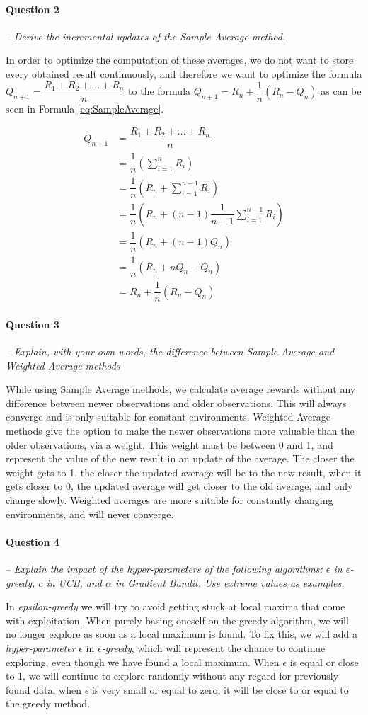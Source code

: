 \documentclass[a4paper]{article}
\newcommand{\question}[2]{
\paragraph{Question #1} -- \textit{#2}

}
\begin{document}
\question{2}{Derive the incremental updates of the Sample 
Average method.}
In order to optimize the computation of these averages, we do not want to store every obtained result continuously, and therefore we want to optimize the formula $Q_{n+1} = \dfrac{R_1 + R_2 + ... + R_n}{n}$ to the formula $Q_{n+1} = R_n + \dfrac{1}{n} (R_n - Q_n)$ as can be seen in Formula \ref{eq:SampleAverage}.

\begin{equation}\label{eq:SampleAverage}
\begin{split}
Q_{n+1} &= \dfrac{R_1 + R_2 + ... + R_n}{n} \\
		&= \dfrac{1}{n} (\sum_{i=1}^{n} R_i) \\
		&= \dfrac{1}{n} (R_n + \sum_{i=1}^{n-1} R_i) \\
		&= \dfrac{1}{n} (R_n + (n-1) \dfrac{1}{n-1} \sum_{i=1}^{n-1} R_i) \\
		&= \dfrac{1}{n} (R_n + (n-1) Q_n) \\
		&= \dfrac{1}{n} (R_n + n Q_n - Q_n) \\
		&= R_n + \dfrac{1}{n} (R_n - Q_n) 
\end{split}
\end{equation}


\question{3}{Explain, with your own words, the difference between Sample Average and Weighted Average methods}
While using Sample Average methods, we calculate average rewards without any difference between newer observations and older observations. This will always converge and is only suitable for constant environments. Weighted Average methods give the option to make the newer observations more valuable than the older observations, via a weight. This weight must be between 0 and 1, and represent the value of the new result in an update of the average. The closer the weight gets to 1, the closer the updated average will be to the new result, when it gets closer to 0, the updated average will get closer to the old average, and only change slowly. Weighted averages are more suitable for constantly changing environments, and will never converge.

\question{4}{Explain the impact of the hyper-parameters of the following algorithms: $\epsilon$ in $\epsilon$-greedy, $c$ in UCB, and $\alpha$ in Gradient Bandit. Use extreme values as examples.}
In \textit{epsilon-greedy} we will try to avoid getting stuck at local maxima that come with exploitation. When purely basing oneself on the greedy algorithm, we will no longer explore as soon as a local maximum is found. To fix this, we will add a \textit{hyper-parameter} $\epsilon$ in \textit{$\epsilon$-greedy}, which will represent the chance to continue exploring, even though we have found a local maximum. When $\epsilon$ is equal or close to 1, we will continue to explore randomly without any regard for previously found data, when $\epsilon$ is very small or equal to zero, it will be close to or equal to the greedy method.
\end{document}
